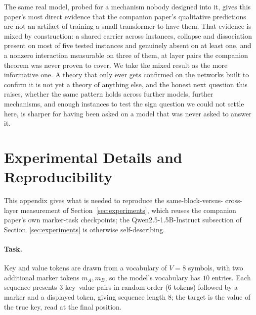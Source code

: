 \documentclass[11pt,a4paper]{article}
\begin{document}
The same real model, probed for a mechanism nobody designed into it, gives
this paper's most direct evidence that the companion paper's qualitative
predictions are not an artifact of training a small transformer to have
them. That evidence is mixed by construction: a shared carrier across
instances, collapse and dissociation present on most of five tested
instances and genuinely absent on at least one, and a nonzero interaction
measurable on three of them, at layer pairs the companion theorem was never
proven to cover. We take the mixed result as the more informative one. A
theory that only ever gets confirmed on the networks built to confirm it is
not yet a theory of anything else, and the honest next question this raises,
whether the same pattern holds across further models, further mechanisms,
and enough instances to test the sign question we could not settle here, is
sharper for having been asked on a model that was never asked to answer it.

\appendix

\section{Experimental Details and Reproducibility}
\label{app:repro}

This appendix gives what is needed to reproduce the same-block-versus-
cross-layer measurement of Section~\ref{sec:experiments}, which reuses the
companion paper's own marker-task checkpoints; the Qwen2.5-1.5B-Instruct
subsection of Section~\ref{sec:experiments} is otherwise self-describing.

\paragraph{Task.} Key and value tokens are drawn from a vocabulary of
$V=8$ symbols, with two additional marker tokens $m_A,m_B$, so the model's
vocabulary has $10$ entries. Each sequence presents $3$ key--value pairs in
random order ($6$ tokens) followed by a marker and a displayed token, giving
sequence length $8$; the target is the value of the true key, read at the
final position.
\end{document}
